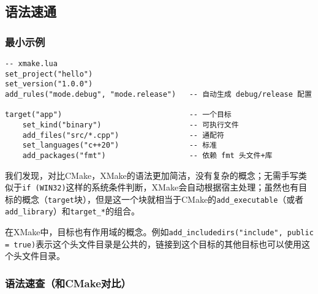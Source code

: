 \documentclass[../main.tex]{subfiles}
\begin{document}
\subsection{语法速通}
\subsubsection{最小示例}
\begin{lstlisting}
-- xmake.lua
set_project("hello")
set_version("1.0.0")
add_rules("mode.debug", "mode.release")   -- 自动生成 debug/release 配置

target("app")                             -- 一个目标
    set_kind("binary")                    -- 可执行文件
    add_files("src/*.cpp")                -- 通配符
    set_languages("c++20")                -- 标准
    add_packages("fmt")                   -- 依赖 fmt 头文件+库
\end{lstlisting}
我们发现，对比CMake，XMake的语法更加简洁，没有复杂的概念；无需手写类似于\texttt{if (WIN32)}这样的系统条件判断，XMake会自动根据宿主处理；虽然也有目标的概念（\texttt{target}块），但是这一个块就相当于CMake的\texttt{add\_executable}（或者\texttt{add\_library}）和\texttt{target\_*}的组合。

在XMake中，目标也有作用域的概念。例如\texttt{add\_includedirs("include", {public = true})}表示这个头文件目录是公共的，链接到这个目标的其他目标也可以使用这个头文件目录。

\subsubsection{语法速查（和CMake对比）}
\end{document}
